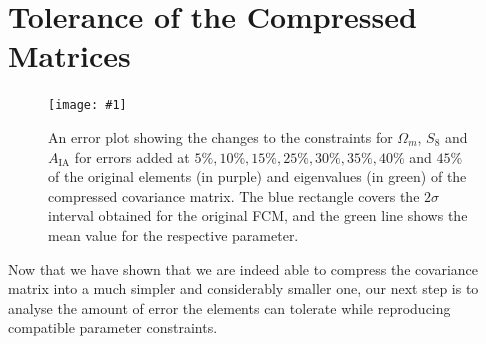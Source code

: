 \documentclass[twocolumn]{\docclass}
\newcommand{\sfig}[2]{
	\texttt{[image: \#1]}
}
\newcommand{\Svwide}[2]{
	\begin{figure}[thbp]
		\sfig{../figures/#1.pdf}{\textwidth}
		\caption{{\small #2}}
		\label{fig:#1}
	\end{figure}
}
\newcommand{\rf}[1]{Figure \ref{fig:#1}}
\newcommand\full{FCM}
\newcommand\gaussian{GCM}
\begin{document}
	
	
	\section{Tolerance of the Compressed Matrices}
	\label{sec:tolerance}
	
	\Svwide{Tolerance_constraints}{An error plot showing the changes to the constraints for $\Omega_m$, $S_8$ and $A_{\mathrm{IA}}$ for errors added at $5\%, 10\%, 15\%, 25\%, 30\%, 35\%, 40\%$ and $45\%$ of the original elements (in purple) and eigenvalues (in green) of the compressed covariance matrix. The blue rectangle covers the $2 \sigma$ interval obtained for the original \full, and the green line shows the mean value for the respective parameter. }
	
	Now that we have shown that we are indeed able to compress the covariance matrix into a much simpler and considerably smaller one, our next step is to analyse the amount of error the elements can tolerate while reproducing compatible parameter constraints. 
	
\end{document}
